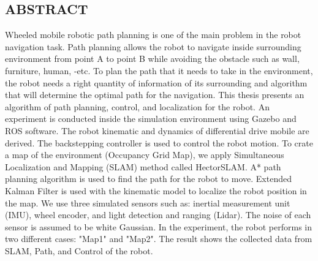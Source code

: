 \begin{center}
	\section*{\centering ABSTRACT}
\end{center}
\hspace{1.5cm}
Wheeled mobile robotic path planning is one of the main problem in the robot navigation task. Path planning allows the robot to navigate inside surrounding environment from point A to point B while avoiding the obstacle such as wall, furniture, human, -etc. To plan the path that it needs to take in the environment, the robot needs a right quantity of information of its surrounding and algorithm that will determine the optimal path for the navigation. This thesis presents an algorithm of path planning, control, and localization for the robot. An experiment is conducted inside the simulation environment using Gazebo and ROS software. The robot kinematic and dynamics of differential drive mobile are derived. The backstepping controller is used to control the robot motion. To crate a map of the environment (Occupancy Grid Map), we apply Simultaneous Localization and Mapping (SLAM) method called HectorSLAM. A* path planning algorithm is used to find the path for the robot to move. Extended Kalman Filter is used with the kinematic model to localize the robot position in the map. We use three simulated sensors such as: inertial measurement unit (IMU), wheel encoder, and light detection and ranging (Lidar). The noise of each sensor is assumed to be white Gaussian. In the experiment, the robot performs in two different cases: "Map1" and "Map2". The result shows the collected data from SLAM, Path, and Control of the robot.\par